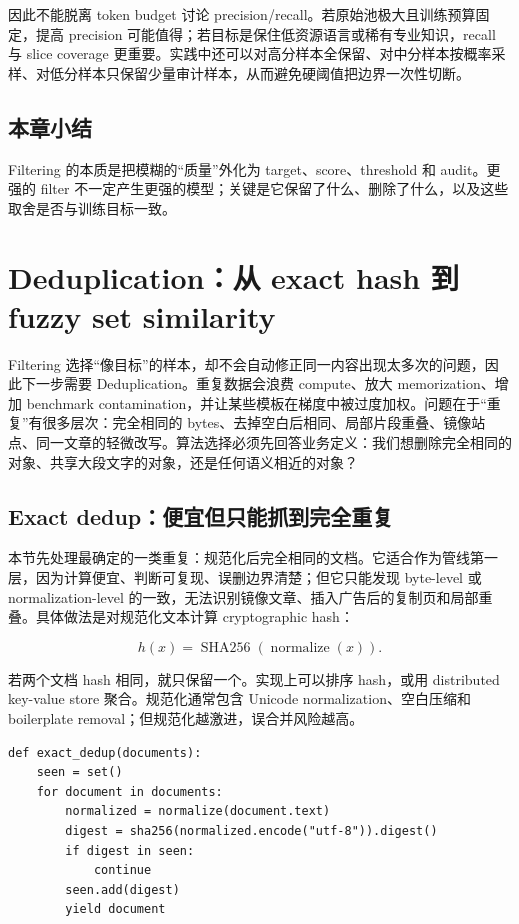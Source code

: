 \documentclass[a4paper]{article}
\begin{document}
因此不能脱离 token budget 讨论 precision/recall。若原始池极大且训练预算固定，提高 precision 可能值得；若目标是保住低资源语言或稀有专业知识，recall 与 slice coverage 更重要。实践中还可以对高分样本全保留、对中分样本按概率采样、对低分样本只保留少量审计样本，从而避免硬阈值把边界一次性切断。

\subsection{本章小结}

Filtering 的本质是把模糊的“质量”外化为 target、score、threshold 和 audit。更强的 filter 不一定产生更强的模型；关键是它保留了什么、删除了什么，以及这些取舍是否与训练目标一致。

\section{Deduplication：从 exact hash 到 fuzzy set similarity}

Filtering 选择“像目标”的样本，却不会自动修正同一内容出现太多次的问题，因此下一步需要 Deduplication。重复数据会浪费 compute、放大 memorization、增加 benchmark contamination，并让某些模板在梯度中被过度加权。问题在于“重复”有很多层次：完全相同的 bytes、去掉空白后相同、局部片段重叠、镜像站点、同一文章的轻微改写。算法选择必须先回答业务定义：我们想删除完全相同的对象、共享大段文字的对象，还是任何语义相近的对象？

\subsection{Exact dedup：便宜但只能抓到完全重复}

本节先处理最确定的一类重复：规范化后完全相同的文档。它适合作为管线第一层，因为计算便宜、判断可复现、误删边界清楚；但它只能发现 byte-level 或 normalization-level 的一致，无法识别镜像文章、插入广告后的复制页和局部重叠。具体做法是对规范化文本计算 cryptographic hash：

$$
h(x)=\operatorname{SHA256}(\operatorname{normalize}(x)).
$$

若两个文档 hash 相同，就只保留一个。实现上可以排序 hash，或用 distributed key-value store 聚合。规范化通常包含 Unicode normalization、空白压缩和 boilerplate removal；但规范化越激进，误合并风险越高。

\begin{lstlisting}[caption={Exact dedup 的最小流程}]
def exact_dedup(documents):
    seen = set()
    for document in documents:
        normalized = normalize(document.text)
        digest = sha256(normalized.encode("utf-8")).digest()
        if digest in seen:
            continue
        seen.add(digest)
        yield document
\end{lstlisting}
\end{document}

